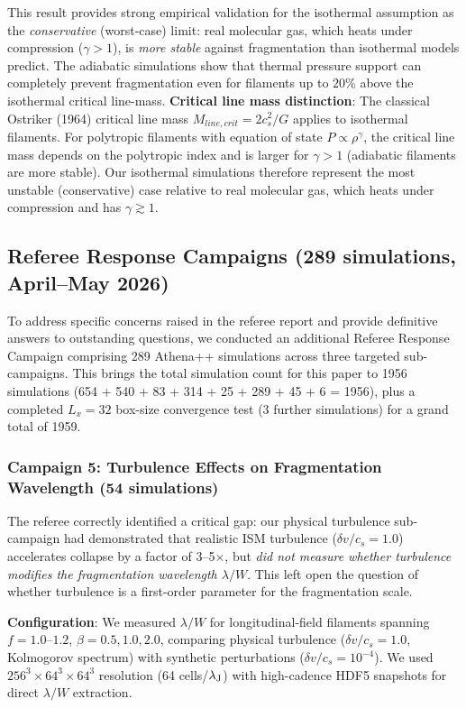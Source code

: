 \documentclass[twoside,twocolumn]{mnras}
\begin{document}
This result provides strong empirical validation for the isothermal assumption as the {\it conservative} (worst-case) limit: real molecular gas, which heats under compression ($\gamma > 1$), is {\it more stable} against fragmentation than isothermal models predict. The adiabatic simulations show that thermal pressure support can completely prevent fragmentation even for filaments up to $20\%$ above the isothermal critical line-mass. \textbf{Critical line mass distinction}: The classical Ostriker (1964) critical line mass $M_{line,crit} = 2c_s^2/G$ applies to isothermal filaments. For polytropic filaments with equation of state $P \propto \rho^\gamma$, the critical line mass depends on the polytropic index and is larger for $\gamma > 1$ (adiabatic filaments are more stable). Our isothermal simulations therefore represent the most unstable (conservative) case relative to real molecular gas, which heats under compression and has $\gamma \gtrsim 1$.

\subsection{Referee Response Campaigns (289 simulations, April--May 2026)}
\label{sec:referee_response}

To address specific concerns raised in the referee report and provide definitive answers to outstanding questions, we conducted an additional Referee Response Campaign comprising 289 Athena++ simulations across three targeted sub-campaigns. This brings the total simulation count for this paper to 1956 simulations (654 + 540 + 83 + 314 + 25 + 289 + 45 + 6 = 1956), plus a completed $L_x = 32$ box-size convergence test (3 further simulations) for a grand total of 1959.

\subsubsection{Campaign 5: Turbulence Effects on Fragmentation Wavelength (54 simulations)}

The referee correctly identified a critical gap: our physical turbulence sub-campaign had demonstrated that realistic ISM turbulence ($\delta v/c_s = 1.0$) accelerates collapse by a factor of 3--5$\times$, but \textit{did not measure whether turbulence modifies the fragmentation wavelength $\lambda/W$}. This left open the question of whether turbulence is a first-order parameter for the fragmentation scale.

\textbf{Configuration}: We measured $\lambda/W$ for longitudinal-field filaments spanning $f = 1.0$--$1.2$, $\beta = 0.5, 1.0, 2.0$, comparing physical turbulence ($\delta v/c_s = 1.0$, Kolmogorov spectrum) with synthetic perturbations ($\delta v/c_s = 10^{-4}$). We used $256^3 \times 64^3 \times 64^3$ resolution (64 cells/$\lambda_{\rm J}$) with high-cadence HDF5 snapshots for direct $\lambda/W$ extraction.
\end{document}

